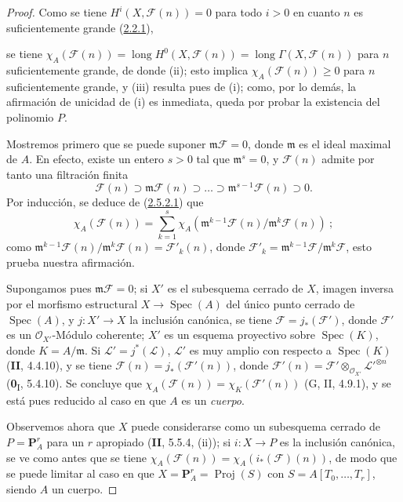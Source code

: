\begin{proof}
Como se tiene $H^i(X,\mathcal F(n))=0$ para todo $i>0$ en cuanto $n$ es
suficientemente grande (\hyperref[III.2.2.1-fr]{2.2.1}),

se tiene
$\chi_A(\mathcal F(n))=\operatorname{long}H^0(X,\mathcal F(n))
=\operatorname{long}\Gamma(X,\mathcal F(n))$
para $n$ suficientemente grande, de donde (ii); esto implica
$\chi_A(\mathcal F(n))\geq0$ para $n$ suficientemente grande, y (iii) resulta pues
de (i); como, por lo demás, la afirmación de unicidad de (i) es inmediata,
queda por probar la existencia del polinomio $P$.

Mostremos primero que se puede suponer $\mathfrak m\mathcal F=0$, donde
$\mathfrak m$ es el ideal maximal de $A$. En efecto, existe un entero
$s>0$ tal que $\mathfrak m^s=0$, y $\mathcal F(n)$ admite por tanto una
filtración finita
\[
\mathcal F(n)\supset\mathfrak m\mathcal F(n)\supset\ldots
\supset\mathfrak m^{s-1}\mathcal F(n)\supset0.
\]
Por inducción, se deduce de
(\hyperref[III.2.5.2.1-fr]{2.5.2.1}) que
\[
\chi_A(\mathcal F(n))=\sum_{k=1}^{s}
\chi_A(\mathfrak m^{k-1}\mathcal F(n)/\mathfrak m^k\mathcal F(n))~;
\]
como
$\mathfrak m^{k-1}\mathcal F(n)/\mathfrak m^k\mathcal F(n)
=\mathcal F'_k(n)$, donde
$\mathcal F'_k=\mathfrak m^{k-1}\mathcal F/\mathfrak m^k\mathcal F$,
esto prueba nuestra afirmación.

Supongamos pues $\mathfrak m\mathcal F=0$; si $X'$ es el subesquema
cerrado de $X$, imagen inversa por el morfismo estructural
$X\to\operatorname{Spec}(A)$ del único punto cerrado de
$\operatorname{Spec}(A)$, y $j:X'\to X$ la inclusión canónica, se tiene
$\mathcal F=j_*(\mathcal F')$, donde $\mathcal F'$ es un
$\mathcal O_{X'}$-Módulo coherente; $X'$ es un esquema proyectivo sobre
$\operatorname{Spec}(K)$, donde $K=A/\mathfrak m$. Si
$\mathcal L'=j^*(\mathcal L)$, $\mathcal L'$ es muy amplio con respecto
a $\operatorname{Spec}(K)$ (\textbf{II}, 4.4.10), y se tiene
$\mathcal F(n)=j_*(\mathcal F'(n))$, donde
$\mathcal F'(n)=\mathcal F'\otimes_{\mathcal O_{X'}}
\mathcal L'^{\otimes n}$ (\textbf{0}\textsubscript{I}, 5.4.10). Se concluye que
$\chi_A(\mathcal F(n))=\chi_K(\mathcal F'(n))$ (G, II, 4.9.1), y se está
pues reducido al caso en que $A$ es un \emph{cuerpo}.

Observemos ahora que $X$ puede considerarse como un subesquema
cerrado de $P=\mathbf P_A^r$ para un $r$ apropiado (\textbf{II}, 5.5.4, (ii));
si $i:X\to P$ es la inclusión canónica, se ve como antes que se
tiene $\chi_A(\mathcal F(n))=\chi_A(i_*(\mathcal F)(n))$, de modo que se
puede limitar al caso en que $X=\mathbf P_A^r=\operatorname{Proj}(S)$ con
$S=A[T_0,\ldots,T_r]$, siendo $A$ un cuerpo.


\end{proof}
